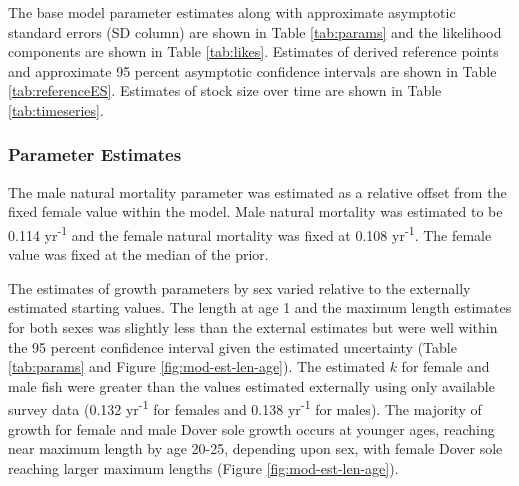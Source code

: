 \documentclass[11pt,
  english,
  a4paper,
]{article}
\begin{document}

The base model parameter estimates along with approximate asymptotic standard errors (SD column) are shown in Table \ref{tab:params} and the likelihood components are shown in Table \ref{tab:likes}. Estimates of derived reference points and approximate 95 percent asymptotic confidence intervals are shown in Table \ref{tab:referenceES}. Estimates of stock size over time are shown in Table \ref{tab:timeseries}.

\leavevmode\tagmcend\tagstructend\par


\hypertarget{parameter-estimates}{%
\subsubsection{Parameter Estimates}\label{parameter-estimates}}

\leavevmode\tagmcend\tagstructend


The male natural mortality parameter was estimated as a relative offset from the fixed female value within the model. Male natural mortality was estimated to be 0.114 yr\textsuperscript{-1} and the female natural mortality was fixed at 0.108 yr\textsuperscript{-1}. The female value was fixed at the median of the prior.

\leavevmode\tagmcend\tagstructend\par


The estimates of growth parameters by sex varied relative to the externally estimated starting values. The length at age 1 and the maximum length estimates for both sexes was slightly less than the external estimates but were well within the 95 percent confidence interval given the estimated uncertainty (Table \ref{tab:params} and Figure \ref{fig:mod-est-len-age}). The estimated {\(k\)\leavevmode\tagmcend\tagstructend} for female and male fish were greater than the values estimated externally using only available survey data (0.132 yr\textsuperscript{-1} for females and 0.138 yr\textsuperscript{-1} for males). The majority of growth for female and male Dover sole growth occurs at younger ages, reaching near maximum length by age 20-25, depending upon sex, with female Dover sole reaching larger maximum lengths (Figure \ref{fig:mod-est-len-age}).
\end{document}
